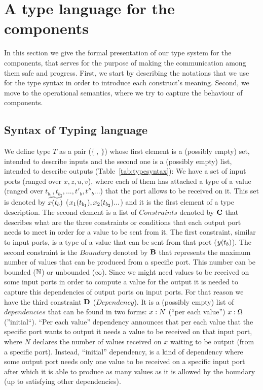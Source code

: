\section{A type language for the components}

In this section we give the formal presentation of our type system for the components, that serves for the purpose of making the communication among them safe and progress. First, we start by describing the notations that we use for the type syntax in order to introduce each construct's meaning. Second, we move to the operational semantics, where we try to capture the behaviour of components.





\subsection{Syntax of Typing language} \label{Syntax of Typing language}

We define type $T$ as a pair ($\{\ ,\ \}$) whose first element is a (possibly empty) set, intended to describe inputs and the second one is a (possibly empty) list, intended to describe outputs (Table~\ref{tab:typesyntax}): We have a set of input ports (ranged over $x,z,u,v$), where each of them has attached a type of a value (ranged over $t_{b_1},t_{b_2},...,t'_{b},t''_{b}...$) that the port allows to be received on it. This set is denoted by $\widetilde{x(t_b)}$ ($x_1(t_{b_1}),x_2(t_{b_2})...$) and it is the first element of a type description. The second element is a list of $Constraints$ denoted by $\textbf{C}$ that describes what are the three constraints or conditions that each output port needs to meet in order for a value to be sent from it. The first constraint, similar to input ports, is a type of a value that can be sent from that port ($y(t_b)$). The second constraint is the $Boundary$ denoted by $\textbf{B}$ that represents the maximum number of values that can be produced from a specific port. This number can be bounded ($\mathbb{N}$) or unbounded ($\infty$). Since we might need values to be received on some input ports in order to compute a value for the output it is needed to capture this dependencies of output ports on input ports. For that reason we have the third constraint $\textbf{D}$ ($Dependency$). It is a (possibly empty) list of $dependencies$ that can be found in two forms: $x:N$ (``per each value'') $x:\Omega$ (''initial``). ``Per each value'' dependency announces that per each value that the specific port wants to output it needs a value to be received on that input port, where $N$ declares the number of values received on $x$ waiting to be output (from a specific port). Instead, ``initial'' dependency, is a kind of dependency where some output port needs only one value to be received on a specific input port after which it is able to produce as many values as it is allowed by the boundary (up to satisfying other dependencies).  

